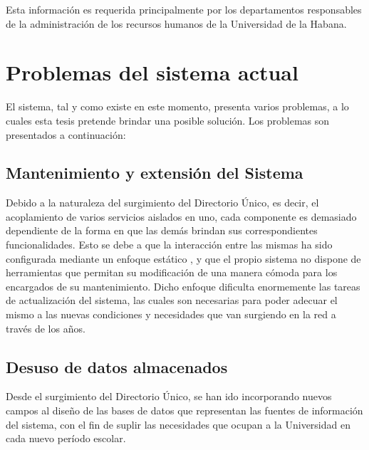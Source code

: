 Esta informaci\'on es requerida principalmente por los departamentos responsables de la administraci\'on de los recursos humanos de la Universidad de la Habana.

\section{Problemas del sistema actual}

El sistema, tal y como existe en este momento, presenta varios problemas, a lo cuales esta tesis pretende brindar una posible soluci\'on. Los problemas son presentados a continuaci\'on:

\subsection{Mantenimiento y extensi\'on del Sistema}

Debido a la naturaleza del surgimiento del Directorio \'Unico, es decir, el acoplamiento de varios servicios aislados en uno, cada componente es demasiado dependiente de la forma en que las dem\'as brindan sus correspondientes funcionalidades. Esto se debe a que la interacci\'on entre las mismas ha sido configurada mediante un enfoque est\'atico , y que el propio sistema no dispone de herramientas que permitan su modificaci\'on de una manera c\'omoda para los encargados de su mantenimiento. Dicho enfoque dificulta enormemente las tareas de actualizaci\'on del sistema, las cuales son necesarias para poder adecuar el mismo a las nuevas condiciones y necesidades que van surgiendo en la red a trav\'es de los años.

\subsection{Desuso de datos almacenados}

Desde el surgimiento del Directorio \'Unico, se han ido incorporando nuevos campos al diseño de las bases de datos que representan las fuentes de informaci\'on del sistema, con el fin de suplir las necesidades que ocupan a la Universidad en cada nuevo per\'iodo escolar. 

